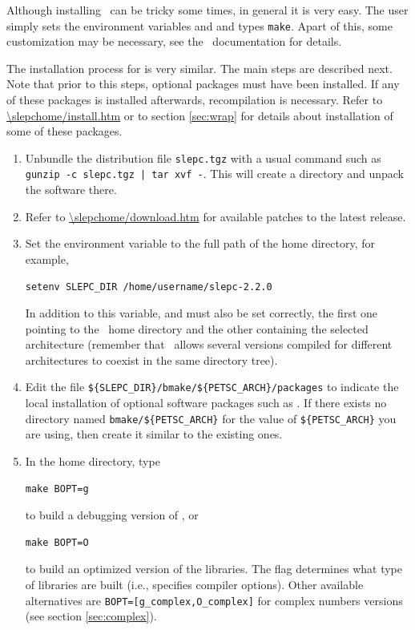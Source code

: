	Although installing \petsc\ can be tricky some times, in general it is very easy. The user simply sets the environment variables  and  and types \texttt{make}. Apart of this, some customization may be necessary, see the \petsc\ documentation for details.

	The installation process for \slepc is very similar. The main steps are described next. Note that prior to this steps, optional packages must have been installed. If any of these packages is installed afterwards, recompilation is necessary. Refer to \url{\slepchome/install.htm} or to section \ref{sec:wrap} for details about installation of some of these packages.

\begin{enumerate}
	\item Unbundle the distribution file \Verb!slepc.tgz! with a usual command such as \Verb!gunzip -c slepc.tgz | tar xvf -!. This will create a directory and unpack the software there.
	\item Refer to \url{\slepchome/download.htm} for available patches to the latest \slepc release.
	\item Set the environment variable  to the full path of the \slepc home directory, for example,
	\begin{Verbatim}[fontsize=\small]
	setenv SLEPC_DIR /home/username/slepc-2.2.0
	\end{Verbatim}
	In addition to this variable,  and  must also be set correctly, the first one pointing to the \petsc\ home directory and the other containing the selected architecture (remember that \petsc\ allows several versions compiled for different architectures to coexist in the same directory tree).
	\item Edit the file \Verb!${SLEPC_DIR}/bmake/${PETSC_ARCH}/packages! to indicate the local installation of optional software packages such as \arpack. If there exists no directory named \Verb!bmake/${PETSC_ARCH}! for the value of \Verb!${PETSC_ARCH}! you are using, then create it similar to the existing ones.
	\item In the \slepc home directory, type
	\begin{Verbatim}[fontsize=\small]
	make BOPT=g
	\end{Verbatim}
      to build a debugging version of \slepc, or
	\begin{Verbatim}[fontsize=\small]
	make BOPT=O
	\end{Verbatim}
      to build an optimized version of the \slepc libraries. The flag  determines what type of libraries are built (i.e., specifies compiler options). Other available alternatives are \Verb!BOPT=[g_complex,O_complex]! for complex numbers versions (see section \ref{sec:complex}).

\end{enumerate}

